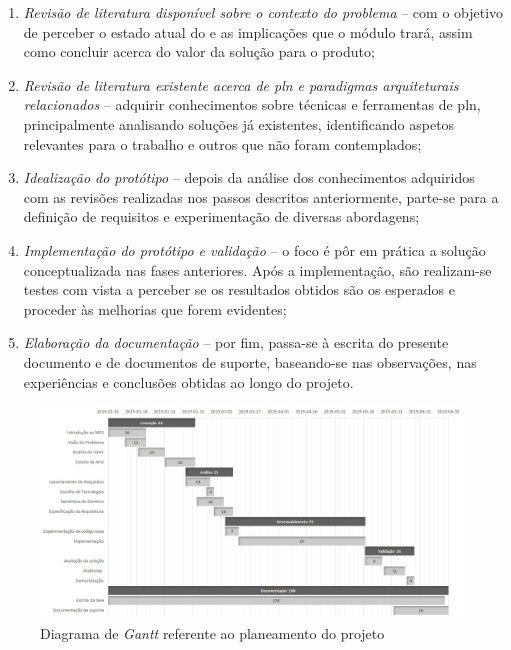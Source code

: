 \begin{enumerate}
    \item 
    {
        \textit{Revisão de literatura disponível sobre o contexto do problema} -- com o objetivo de perceber o estado atual do {\productname} e as implicações que o módulo trará, assim como concluir acerca do valor da solução para o produto;
    }
    \item
    {
        \textit{Revisão de literatura existente acerca de \gls{pln} e paradigmas arquiteturais relacionados} -- adquirir conhecimentos sobre técnicas e ferramentas de \gls{pln}, principalmente analisando soluções já existentes, identificando aspetos relevantes para o trabalho e outros que não foram contemplados;
    }
    \item
    {
        \textit{Idealização do protótipo} -- depois da análise dos conhecimentos adquiridos com as revisões realizadas nos passos descritos anteriormente,
        parte-se para a definição de requisitos e experimentação de diversas abordagens;
    }
    \item
    {
        \textit{Implementação do protótipo e validação} -- o foco é pôr em prática a solução conceptualizada nas fases anteriores. Após a implementação, são realizam-se testes com vista a perceber se os resultados obtidos são os esperados e proceder às melhorias que forem evidentes;
    }
    \item
    {
        \textit{Elaboração da documentação} --  por fim, passa-se à escrita do presente documento e de documentos de suporte, baseando-se nas observações, nas experiências e conclusões obtidas ao longo do projeto.
    }
\end{enumerate}

\begin{figure}
    \centering
    \includegraphics[width=\textwidth]{ch01/assets/gantt.jpg}
    \caption{Diagrama de \textit{Gantt} referente ao planeamento do projeto}
    \label{fig:planning-gantt_chart}
\end{figure}
